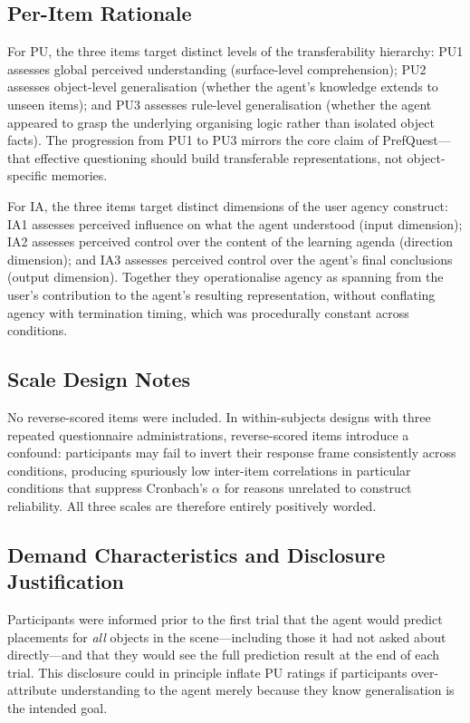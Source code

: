\documentclass[manuscript,review,anonymous]{acmart}
\begin{document}
\subsection*{Per-Item Rationale}

For PU, the three items target distinct levels of the transferability hierarchy: PU1 assesses global perceived understanding (surface-level comprehension); PU2 assesses object-level generalisation (whether the agent's knowledge extends to unseen items); and PU3 assesses rule-level generalisation (whether the agent appeared to grasp the underlying organising logic rather than isolated object facts). The progression from PU1 to PU3 mirrors the core claim of PrefQuest---that effective questioning should build transferable representations, not object-specific memories.

For IA, the three items target distinct dimensions of the user agency construct: IA1 assesses perceived influence on what the agent understood (input dimension); IA2 assesses perceived control over the content of the learning agenda (direction dimension); and IA3 assesses perceived control over the agent's final conclusions (output dimension). Together they operationalise agency as spanning from the user's contribution to the agent's resulting representation, without conflating agency with termination timing, which was procedurally constant across conditions.

\subsection*{Scale Design Notes}

No reverse-scored items were included. In within-subjects designs with three repeated questionnaire administrations, reverse-scored items introduce a confound: participants may fail to invert their response frame consistently across conditions, producing spuriously low inter-item correlations in particular conditions that suppress Cronbach's $\alpha$ for reasons unrelated to construct reliability. All three scales are therefore entirely positively worded.

\subsection*{Demand Characteristics and Disclosure Justification}

Participants were informed prior to the first trial that the agent would predict placements for \textit{all} objects in the scene---including those it had not asked about directly---and that they would see the full prediction result at the end of each trial. This disclosure could in principle inflate PU ratings if participants over-attribute understanding to the agent merely because they know generalisation is the intended goal.
\end{document}
